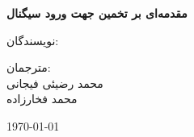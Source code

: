 \documentclass[12pt,a4paper]{book}
\begin{document}
	
	\begin{titlepage}
		\centering
		
		\vspace*{2cm}
		
		{\Huge \textbf{
{مقدمه‌ای بر تخمین جهت ورود سیگنال}
			}
		}\\[0.8cm]
		
		{
			\Large {}
		}
		
		\vspace{2cm}
		
		{\large نویسندگان:}\\[0.5cm]
		
		
		\vfill
		
		{\large مترجمان:}\\[0.5cm]
		محمد رضیئی فیجانی
		\\
	      محمد فخارزاده
		
		\vspace{1cm}
		
		{\large \today}
		
	\end{titlepage}
	
	
	
		
	\tableofcontents
	\newpage
	
	
	\twocolumnfootnotes
	
	
	
	
	

	
\end{document}
